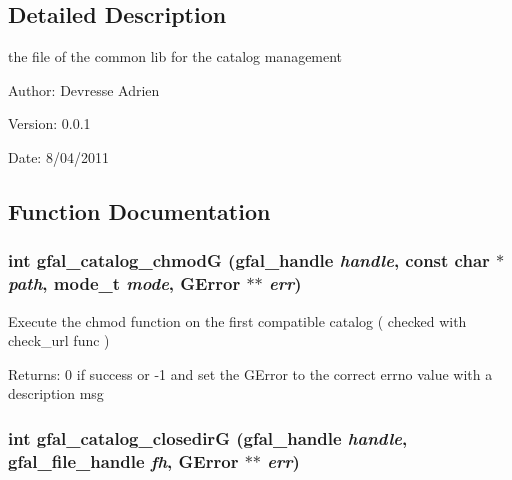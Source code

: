 \subsection{Detailed Description}
the file of the common lib for the catalog management 

\begin{Desc}
\item[Author:]Devresse Adrien \end{Desc}
\begin{Desc}
\item[Version:]0.0.1 \end{Desc}
\begin{Desc}
\item[Date:]8/04/2011 \end{Desc}


\subsection{Function Documentation}
\subsubsection{\setlength{\rightskip}{0pt plus 5cm}int gfal\_\-catalog\_\-chmod\-G (gfal\_\-handle {\em handle}, const char $\ast$ {\em path}, mode\_\-t {\em mode}, GError $\ast$$\ast$ {\em err})}\label{gfal__common__catalog_8c_12b613d1db9c17e70e679ef7285f6a6f}


Execute the chmod function on the first compatible catalog ( checked with check\_\-url func ) \begin{Desc}
\item[Returns:]0 if success or -1 and set the GError to the correct errno value with a description msg \end{Desc}
\subsubsection{\setlength{\rightskip}{0pt plus 5cm}int gfal\_\-catalog\_\-closedir\-G (gfal\_\-handle {\em handle}, gfal\_\-file\_\-handle {\em fh}, GError $\ast$$\ast$ {\em err})}\label{gfal__common__catalog_8c_348fe15690faed2e2731d15eb6cc7856}


